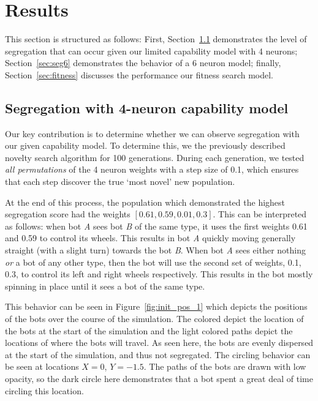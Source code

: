 \section{Results}
\label{sec:res}

This section is structured as follows: First, Section~\ref{sec:seg4} demonstrates the level of segregation that can occur given our limited capability model with 4 neurons; Section~\ref{sec:seg6} demonstrates the behavior of a 6 neuron model; finally, Section~\ref{sec:fitness} discusses the performance our fitness search model. 


\subsection{Segregation with 4-neuron capability model}
\label{sec:seg4}

Our key contribution is to determine whether we can observe segregation with our given capability model. 
To determine this, we the previously described novelty search algorithm for 100 generations.
During each generation, we tested \emph{all permutations} of the 4 neuron weights with a step size of 0.1, which ensures that each step discover the true `most novel' new population.

At the end of this process, the population which demonstrated the highest segregation score had the weights $[0.61, 0.59, 0.01, 0.3]$. 
This can be interpreted as follows: when bot \emph{A} sees bot \emph{B} of the same type, it uses the first weights 0.61 and 0.59 to control its wheels.
This results in bot \emph{A} quickly moving generally straight (with a slight turn) towards the bot \emph{B}. 
When bot \emph{A} sees either nothing \emph{or} a bot of any other type, then the bot will use the second set of weights, 0.1, 0.3, to control its left and right wheels respectively. 
This results in the bot mostly spinning in place until it sees a bot of the same type. 

This behavior can be seen in Figure~\ref{fig:init_pos_1} which depicts the positions of the bots over the course of the simulation. 
The colored depict the location of the bots at the start of the simulation and the light colored paths depict the locations of where the bots will travel. 
As seen here, the bots are evenly dispersed at the start of the simulation, and thus not segregated.
The circling behavior can be seen at locations $X= 0$, $Y= -1.5$. 
The paths of the bots are drawn with low opacity, so the dark circle here demonstrates that a bot spent a great deal of time circling this location. 


